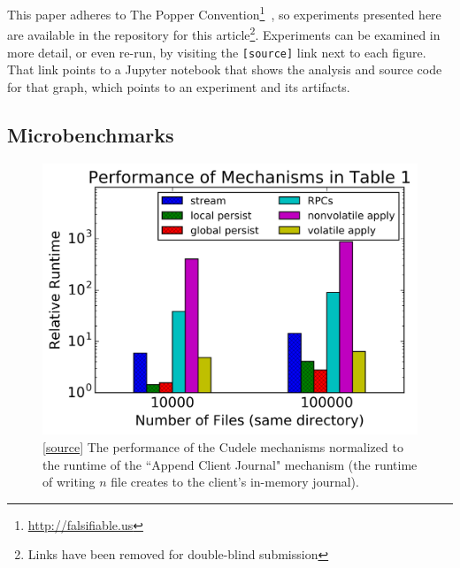 
This paper adheres to The Popper
Convention\footnote{\url{http://falsifiable.us}}~\cite{jimenez_popper_2016}, so
experiments presented here are available in the repository for this
article\footnote{Links have been removed for double-blind submission}.
Experiments can be examined in more detail, or even re-run, by visiting the
\texttt{[source]} link next to each figure. That link points to a Jupyter
notebook that shows the analysis and source code for that graph, which points
to an experiment and its artifacts.


\subsection{Microbenchmarks}
\begin{figure}[tb]
\centering
\includegraphics[width=1.0\linewidth]{graphs/slowdown-mechanisms.png}
\caption{
[\href{https://...}{source}]
The performance of the Cudele mechanisms normalized to the runtime of the
``Append Client Journal" mechanism (the runtime of writing \(n\) file creates
to the client's in-memory journal).  \label{fig:slowdown-mechanisms}}
\end{figure}

